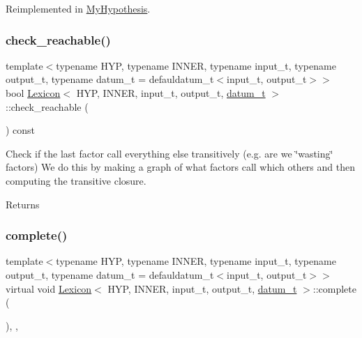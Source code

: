 Reimplemented in \hyperlink{class_my_hypothesis_a61391d3f1f6fbbe37663b22e2068ac90}{My\+Hypothesis}.

\mbox{\label{class_lexicon_a1e58bf42fb2388eff629bc899d8ef5ed}} 
\subsubsection{\texorpdfstring{check\+\_\+reachable()}{check\_reachable()}}
{\footnotesize\ttfamily template$<$typename H\+YP, typename I\+N\+N\+ER, typename input\+\_\+t, typename output\+\_\+t, typename datum\+\_\+t = defauldatum\+\_\+t$<$input\+\_\+t, output\+\_\+t$>$$>$ \\
bool \hyperlink{class_lexicon}{Lexicon}$<$ H\+YP, I\+N\+N\+ER, input\+\_\+t, output\+\_\+t, \hyperlink{class_bayesable_a9f1a6c0cd7855550fa10b1a8f13a5867}{datum\+\_\+t} $>$\+::check\+\_\+reachable (\begin{DoxyParamCaption}{ }\end{DoxyParamCaption}) const\hspace{0.3cm}{\ttfamily [inline]}}

Check if the last factor call everything else transitively (e.\+g. are we \char`\"{}wasting\char`\"{} factors) We do this by making a graph of what factors call which others and then computing the transitive closure. \begin{DoxyReturn}{Returns}

\end{DoxyReturn}
\mbox{\label{class_lexicon_a724ccdaffe9090488bfaa786873fa807}} 
\subsubsection{\texorpdfstring{complete()}{complete()}}
{\footnotesize\ttfamily template$<$typename H\+YP, typename I\+N\+N\+ER, typename input\+\_\+t, typename output\+\_\+t, typename datum\+\_\+t = defauldatum\+\_\+t$<$input\+\_\+t, output\+\_\+t$>$$>$ \\
virtual void \hyperlink{class_lexicon}{Lexicon}$<$ H\+YP, I\+N\+N\+ER, input\+\_\+t, output\+\_\+t, \hyperlink{class_bayesable_a9f1a6c0cd7855550fa10b1a8f13a5867}{datum\+\_\+t} $>$\+::complete (\begin{DoxyParamCaption}{ }\end{DoxyParamCaption})\hspace{0.3cm}{\ttfamily [inline]}, {\ttfamily [override]}, {\ttfamily [virtual]}}



